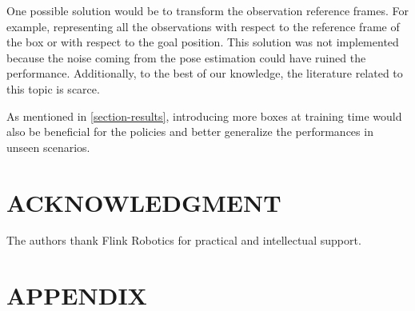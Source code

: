 \documentclass[letterpaper, 10 pt, conference]{ieeeconf}  %
\begin{document}
One possible solution would be to transform the observation reference frames. For example, representing all the observations with respect to the reference frame of the box or with respect to the goal position. This solution was not implemented because the noise coming from the pose estimation could have ruined the performance. Additionally, to the best of our knowledge, the literature related to this topic is scarce.

As mentioned in \cref{section-results}, introducing more boxes at training time would also be beneficial for the policies and better generalize the performances in unseen scenarios.

\addtolength{\textheight}{-1cm}   %


\section*{ACKNOWLEDGMENT}

The authors thank Flink Robotics for practical and intellectual support.


\printbibliography



\section*{APPENDIX}\label{appendix}
\end{document}
